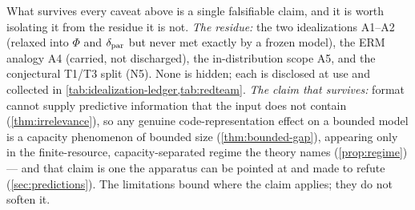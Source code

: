 \begin{remark}
\label{rem:lim-residue}
What survives every caveat above is a single falsifiable claim, and it is worth
isolating it from the residue it is not. \emph{The residue:} the two
idealizations A1--A2 (relaxed into $\Phi$ and $\delta_{\mathrm{par}}$ but never met
exactly by a frozen model), the ERM analogy A4 (carried, not discharged), the
in-distribution scope A5, and the conjectural T1/T3 split (N5). None is hidden;
each is disclosed at use and collected in
\cref{tab:idealization-ledger,tab:redteam}. \emph{The claim that survives:}
format cannot supply predictive information that the input does not contain
(\cref{thm:irrelevance}), so any genuine code-representation effect on a bounded
model is a capacity phenomenon of bounded size (\cref{thm:bounded-gap}),
appearing only in the finite-resource, capacity-separated regime the theory
names (\cref{prop:regime}) --- and that claim is one the apparatus can be pointed
at and made to refute (\cref{sec:predictions}). The limitations bound where the
claim applies; they do not soften it.
\end{remark}
